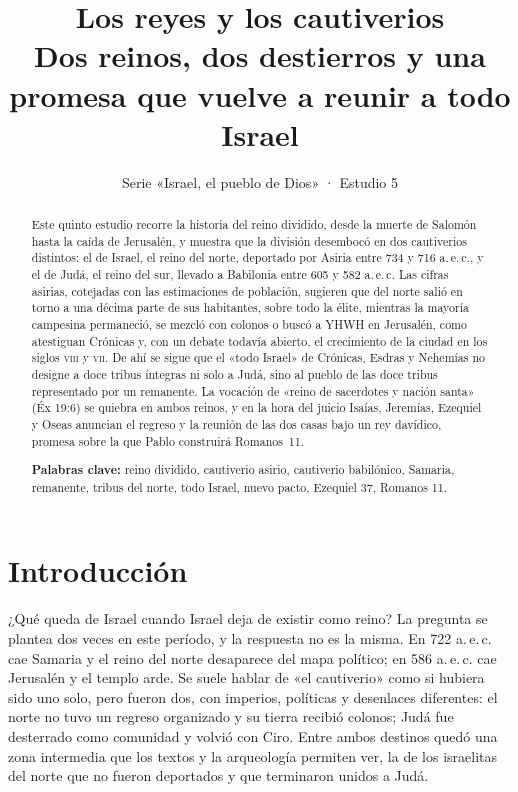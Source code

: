 \documentclass[11pt,letterpaper]{article}
\title{\color{ladrillo}\bfseries Los reyes y los cautiverios\\[4pt]\large\color{cafe}\mdseries Dos reinos, dos destierros y una promesa que vuelve a reunir a todo Israel}
\author{}\date{\color{sepia}Serie «Israel, el pueblo de Dios» · Estudio 5}
\begin{document}
\maketitle\thispagestyle{empty}

\begin{abstract}\noindent
Este quinto estudio recorre la historia del reino dividido, desde la muerte de Salomón hasta la caída de Jerusalén, y muestra que la división desembocó en dos cautiverios distintos: el de Israel, el reino del norte, deportado por Asiria entre 734 y 716 a.\,e.\,c., y el de Judá, el reino del sur, llevado a Babilonia entre 605 y 582 a.\,e.\,c. Las cifras asirias, cotejadas con las estimaciones de población, sugieren que del norte salió en torno a una décima parte de sus habitantes, sobre todo la élite, mientras la mayoría campesina permaneció, se mezcló con colonos o buscó a YHWH en Jerusalén, como atestiguan Crónicas y, con un debate todavía abierto, el crecimiento de la ciudad en los siglos \textsc{viii} y \textsc{vii}. De ahí se sigue que el «todo Israel» de Crónicas, Esdras y Nehemías no designe a doce tribus íntegras ni solo a Judá, sino al pueblo de las doce tribus representado por un remanente. La vocación de «reino de sacerdotes y nación santa» (Éx 19:6) se quiebra en ambos reinos, y en la hora del juicio Isaías, Jeremías, Ezequiel y Oseas anuncian el regreso y la reunión de las dos casas bajo un rey davídico, promesa sobre la que Pablo construirá Romanos~11.
\par\smallskip\noindent\textbf{Palabras clave:} reino dividido, cautiverio asirio, cautiverio babilónico, Samaria, remanente, tribus del norte, todo Israel, nuevo pacto, Ezequiel 37, Romanos 11.
\end{abstract}

\section{Introducción}

¿Qué queda de Israel cuando Israel deja de existir como reino? La pregunta se plantea dos veces en este período, y la respuesta no es la misma. En 722 a.\,e.\,c. cae Samaria y el reino del norte desaparece del mapa político; en 586 a.\,e.\,c. cae Jerusalén y el templo arde. Se suele hablar de «el cautiverio» como si hubiera sido uno solo, pero fueron dos, con imperios, políticas y desenlaces diferentes: el norte no tuvo un regreso organizado y su tierra recibió colonos; Judá fue desterrado como comunidad y volvió con Ciro. Entre ambos destinos quedó una zona intermedia que los textos y la arqueología permiten ver, la de los israelitas del norte que no fueron deportados y que terminaron unidos a Judá.
\end{document}
